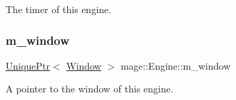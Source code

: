 The timer of this engine. \mbox{\label{classmage_1_1_engine_a8b710b9c37a48caad05896102c4b6980}} 
\subsubsection{\texorpdfstring{m\+\_\+window}{m\_window}}
{\footnotesize\ttfamily \mbox{\hyperlink{namespacemage_a3316d7143a973e37adf1110f2e80ca31}{Unique\+Ptr}}$<$ \mbox{\hyperlink{classmage_1_1_window}{Window}} $>$ mage\+::\+Engine\+::m\+\_\+window\hspace{0.3cm}{\ttfamily [private]}}

A pointer to the window of this engine. 